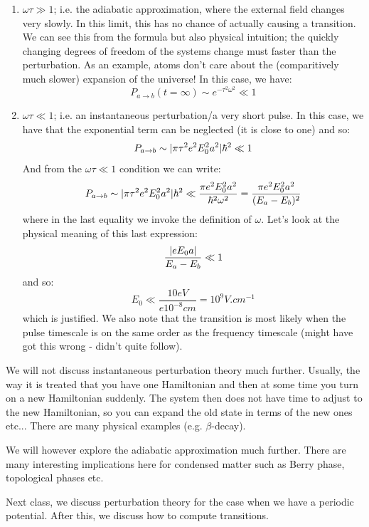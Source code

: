\begin{enumerate}
    \item $\omega \tau \gg 1$; i.e. the adiabatic approximation, where the external field changes very slowly. In this limit, this has no chance of actually causing a transition. We can see this from the formula but also physical intuition; the quickly changing degrees of freedom of the systems change must faster than the perturbation. As an example, atoms don't care about the (comparitively much slower) expansion of the universe! In this case, we have:
    \begin{equation}
        P_{a \to b}(t = \infty) \sim e^{-\tau^2\omega^2} \ll 1
    \end{equation}
    \item $\omega \tau \ll 1$; i.e. an instantaneous perturbation/a very short pulse. In this case, we have that the exponential term can be neglected (it is close to one) and so:
    \begin{equation}
        P_{a \to b} \sim \lvert \pi \tau^2 e^2 E_0^2 a^2 \rvert{\hbar^2} \ll 1
    \end{equation}
    And from the $\omega \tau \ll 1$ condition we can write:
    \begin{equation}
        P_{a \to b} \sim \lvert \pi \tau^2 e^2 E_0^2 a^2 \rvert{\hbar^2} \ll \frac{\pi e^2E_0^2 a^2}{\hbar^2\omega^2} = \frac{\pi e^2E_0^2 a^2}{(E_a - E_b)^2}
    \end{equation}
    where in the last equality we invoke the definition of $\omega$. Let's look at the physical meaning of this last expression:
    \begin{equation}
        \frac{\lvert eE_0a \rvert}{E_a - E_b} \ll 1
    \end{equation}
    and so:
    \begin{equation}
        E_0 \ll \frac{10\si{eV}}{e 10^{-8}\si{cm}} = 10^9 \si{V.cm^{-1}}
    \end{equation}
    which is justified. We also note that the transition is most likely when the pulse timescale is on the same order as the frequency timescale (might have got this wrong - didn't quite follow).
\end{enumerate}

We will not discuss instantaneous perturbation theory much further. Usually, the way it is treated that you have one Hamiltonian and then at some time you turn on a new Hamiltonian suddenly. The system then does not have time to adjust to the new Hamiltonian, so you can expand the old state in terms of the new ones etc... There are many physical examples (e.g. $\beta$-decay). 

We will however explore the adiabatic approximation much further. There are many interesting implications here for condensed matter such as Berry phase, topological phases etc.

Next class, we discuss perturbation theory for the case when we have a periodic potential. After this, we discuss how to compute transitions.